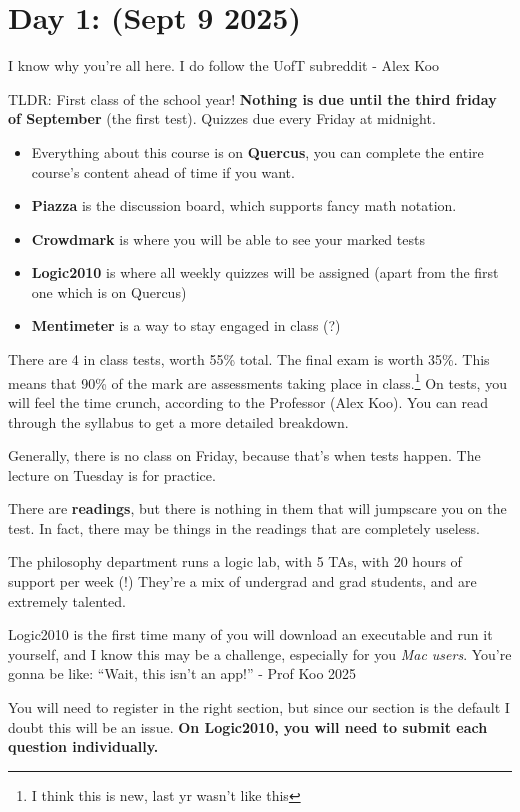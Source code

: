 \section{Day 1: (Sept 9 2025)}

\begin{remark}
I know why you're all here. I do follow the UofT subreddit - Alex Koo
\end{remark}

\noindent TLDR: First class of the school year! \textbf{Nothing is due until the third friday of September} (the first test). Quizzes due every Friday at midnight.

\begin{itemize}
\item Everything about this course is on \textbf{Quercus}, you can complete the entire course's content ahead of time if you want. 
\item \textbf{Piazza} is the discussion board, which supports fancy math notation.
\item \textbf{Crowdmark} is where you will be able to see your marked tests
    \item \textbf{Logic2010} is where all weekly quizzes will be assigned (apart from the first one which is on Quercus)
    \item \textbf{Mentimeter} is a way to stay engaged in class (?)
\end{itemize}

There are 4 in class tests, worth 55\% total. The final exam is worth 35\%. This means that 90\% of the mark are assessments taking place in class.\footnote{I think this is new, last yr wasn't like this} On tests, you will feel the time crunch, according to the Professor (Alex Koo). You can read through the syllabus to get a more detailed breakdown.

Generally, there is no class on Friday, because that's when tests happen. The lecture on Tuesday is for practice.

There are \textbf{readings}, but there is nothing in them that will jumpscare you on the test. In fact, there may be things in the readings that are completely useless.

The philosophy department runs a logic lab, with 5 TAs, with 20 hours of support per week (!) They're a mix of undergrad and grad students, and are extremely talented.

\begin{remark}
Logic2010 is the first time many of you will download an executable and run it yourself, and I know this may be a challenge, especially for you \textit{Mac users}. You're gonna be like: ``Wait, this isn't an app!'' - Prof Koo 2025
\end{remark}

You will need to register in the right section, but since our section is the default I doubt this will be an issue. \textbf{On Logic2010, you will need to submit each question individually.}
